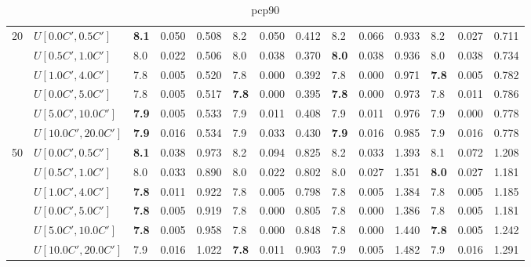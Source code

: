 \begin{table}[h]
{\begin{tabular}{|l|l||l|l|l||l|l|l||l|l|l||l|l|l|}
      \hline\hline
      \multirow{6}{*}{20} & $U[0.0C',0.5C']$ & \textbf{8.1} & 0.050 & 0.508 & 8.2 & 0.050 & 0.412 & 8.2 & 0.066 & 0.933 & 8.2 & 0.027 & 0.711 \\
       & $U[0.5C',1.0C']$ & 8.0 & 0.022 & 0.506 & 8.0 & 0.038 & 0.370 & \textbf{8.0} & 0.038 & 0.936 & 8.0 & 0.038 & 0.734 \\
       & $U[1.0C',4.0C']$ & 7.8 & 0.005 & 0.520 & 7.8 & 0.000 & 0.392 & 7.8 & 0.000 & 0.971 & \textbf{7.8} & 0.005 & 0.782 \\
       & $U[0.0C',5.0C']$ & 7.8 & 0.005 & 0.517 & \textbf{7.8} & 0.000 & 0.395 & \textbf{7.8} & 0.000 & 0.973 & 7.8 & 0.011 & 0.786 \\
       & $U[5.0C',10.0C']$ & \textbf{7.9} & 0.005 & 0.533 & 7.9 & 0.011 & 0.408 & 7.9 & 0.011 & 0.976 & 7.9 & 0.000 & 0.778 \\
       & $U[10.0C',20.0C']$ & \textbf{7.9} & 0.016 & 0.534 & 7.9 & 0.033 & 0.430 & \textbf{7.9} & 0.016 & 0.985 & 7.9 & 0.016 & 0.778 \\
      \hline\hline
      \multirow{6}{*}{50} & $U[0.0C',0.5C']$ & \textbf{8.1} & 0.038 & 0.973 & 8.2 & 0.094 & 0.825 & 8.2 & 0.033 & 1.393 & 8.1 & 0.072 & 1.208 \\
       & $U[0.5C',1.0C']$ & 8.0 & 0.033 & 0.890 & 8.0 & 0.022 & 0.802 & 8.0 & 0.027 & 1.351 & \textbf{8.0} & 0.027 & 1.181 \\
       & $U[1.0C',4.0C']$ & \textbf{7.8} & 0.011 & 0.922 & 7.8 & 0.005 & 0.798 & 7.8 & 0.005 & 1.384 & 7.8 & 0.005 & 1.185 \\
       & $U[0.0C',5.0C']$ & \textbf{7.8} & 0.005 & 0.919 & 7.8 & 0.000 & 0.805 & 7.8 & 0.000 & 1.386 & 7.8 & 0.005 & 1.181 \\
       & $U[5.0C',10.0C']$ & \textbf{7.8} & 0.005 & 0.958 & 7.8 & 0.000 & 0.848 & 7.8 & 0.000 & 1.440 & \textbf{7.8} & 0.005 & 1.242 \\
       & $U[10.0C',20.0C']$ & 7.9 & 0.016 & 1.022 & \textbf{7.8} & 0.011 & 0.903 & 7.9 & 0.005 & 1.482 & 7.9 & 0.016 & 1.291 \\
      \hline
      \end{tabular}
      }
      \caption{pcp90}
      \label{tab:pcp90}\end{table}
      
